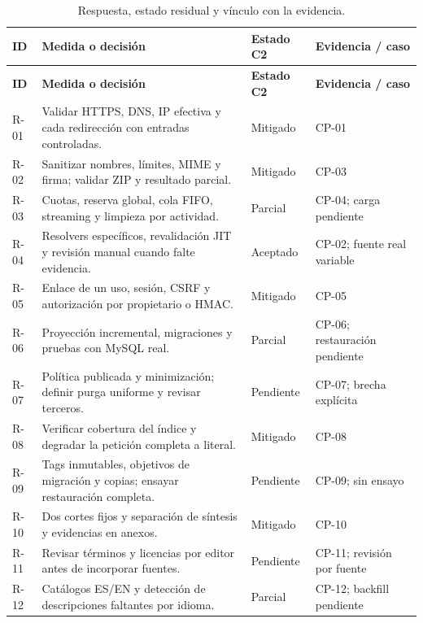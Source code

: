 {\small
	\begin{longtable}{p{}p{}p{}p{}}
		\caption{Respuesta, estado residual y vínculo con la evidencia.}\label{tabla:respuestas-riesgos}                                                     \\
		\toprule
		\textbf{ID} & \textbf{Medida o decisión}                                                        & \textbf{Estado C2} & \textbf{Evidencia / caso}     \\
		\midrule
		\endfirsthead
		\toprule
		\textbf{ID} & \textbf{Medida o decisión}                                                        & \textbf{Estado C2} & \textbf{Evidencia / caso}     \\
		\midrule
		\endhead
		R-01        & Validar HTTPS, DNS, IP efectiva y cada redirección con entradas controladas.      & Mitigado           & CP-01                         \\
		R-02        & Sanitizar nombres, límites, MIME y firma; validar ZIP y resultado parcial.        & Mitigado           & CP-03                         \\
		R-03        & Cuotas, reserva global, cola FIFO, streaming y limpieza por actividad.            & Parcial            & CP-04; carga pendiente        \\
		R-04        & Resolvers específicos, revalidación JIT y revisión manual cuando falte evidencia. & Aceptado           & CP-02; fuente real variable   \\
		R-05        & Enlace de un uso, sesión, CSRF y autorización por propietario o HMAC.             & Mitigado           & CP-05                         \\
		R-06        & Proyección incremental, migraciones y pruebas con MySQL real.                     & Parcial            & CP-06; restauración pendiente \\
		R-07        & Política publicada y minimización; definir purga uniforme y revisar terceros.     & Pendiente          & CP-07; brecha explícita       \\
		R-08        & Verificar cobertura del índice y degradar la petición completa a literal.         & Mitigado           & CP-08                         \\
		R-09        & Tags inmutables, objetivos de migración y copias; ensayar restauración completa.  & Pendiente          & CP-09; sin ensayo             \\
		R-10        & Dos cortes fijos y separación de síntesis y evidencias en anexos.                 & Mitigado           & CP-10                         \\
		R-11        & Revisar términos y licencias por editor antes de incorporar fuentes.              & Pendiente          & CP-11; revisión por fuente    \\
		R-12        & Catálogos ES/EN y detección de descripciones faltantes por idioma.                & Parcial            & CP-12; backfill pendiente     \\
		\bottomrule
	\end{longtable}
}

